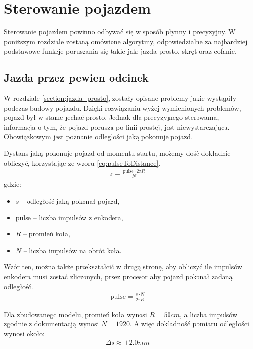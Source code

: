 \section{Sterowanie pojazdem}
    Sterowanie pojazdem powinno odbywać się w sposób płynny i precyzyjny.
    W poniższym rozdziale zostaną omówione algorytmy, odpowiedzialne za najbardziej podstawowe funkcje poruszania się takie jak: jazda prosto, skręt oraz cofanie.

    \subsection{Jazda przez pewien odcinek}
    \label{subsec:jazda_przez_odcinek}
        W rozdziale \ref{section:jazda_prosto}, zostały opisane problemy jakie wystąpiły podczas budowy pojazdu. %
        Dzięki rozwiązaniu wyżej wymienionych problemów, pojazd był w stanie jechać prosto.
        Jednak dla precyzyjnego sterowania, informacja o tym, że pojazd porusza po linii prostej, jest niewystarczająca.
        Obowiązkowym jest poznanie odległości jaką pokonuje pojazd.

        Dystans jaką pokonuje pojazd od momentu startu, możemy dość dokładnie obliczyć, korzystając ze wzoru \eqref{eq:pulseToDistance}.
        \begin{gather}
            s = \frac{\text{pulse} \cdot 2\pi R}{N}
            \label{eq:pulseToDistance}
        \end{gather}
        gdzie:
        \begin{itemize}
            \item $s$ -- odległość jaką pokonał pojazd,
            \item $\text{pulse}$ -- liczba impulsów z enkodera,
            \item $R$ -- promień koła,
            \item $N$ -- liczba impulsów na obrót koła.
        \end{itemize}

        Wzór ten, można także przekształcić w drugą stronę, aby obliczyć ile impulsów enkodera musi zostać zliczonych, przez procesor aby pojazd pokonał zadaną odległość.
        \begin{gather}
            \text{pulse} = \frac{s \cdot N}{2\pi R}
            \label{eq:distanceToPulse}
        \end{gather}

        Dla zbudowanego modelu, promień koła wynosi $R = 50cm$, a liczba impulsów zgodnie z dokumentacją wynosi $N = 1920$.
        A więc dokładność pomiaru odległości wynosi około:
        \begin{gather}
            \Delta s \approx \pm2.0mm
        \end{gather}

